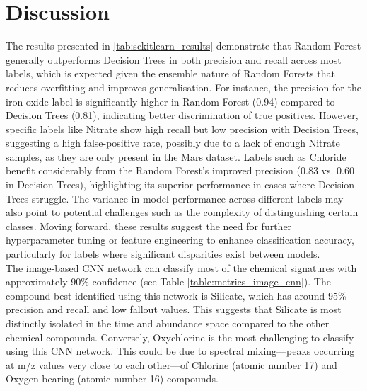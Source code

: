 \section{Discussion} \label{sec:discussions}
The results presented in \cref{tab:sckitlearn_results} demonstrate that Random Forest generally outperforms Decision Trees in both precision and recall across most labels, which is expected given the ensemble nature of Random Forests that reduces overfitting and improves generalisation. For instance, the precision for the iron oxide label is significantly higher in Random Forest (0.94) compared to Decision Trees (0.81), indicating better discrimination of true positives. However, specific labels like Nitrate show high recall but low precision with Decision Trees, suggesting a high false-positive rate, possibly due to a lack of enough Nitrate samples, as they are only present in the Mars dataset. Labels such as Chloride benefit considerably from the Random Forest's improved precision (0.83 vs. 0.60 in Decision Trees), highlighting its superior performance in cases where Decision Trees struggle. The variance in model performance across different labels may also point to potential challenges such as the complexity of distinguishing certain classes. Moving forward, these results suggest the need for further hyperparameter tuning or feature engineering to enhance classification accuracy, particularly for labels where significant disparities exist between models. \\

The image-based CNN network can classify most of the chemical signatures with approximately 90\% confidence (see Table \ref{table:metrics_image_cnn}). The compound best identified using this network is Silicate, which has around 95\% precision and recall and low fallout values. This suggests that Silicate is most distinctly isolated in the time and abundance space compared to the other chemical compounds. Conversely, Oxychlorine is the most challenging to classify using this CNN network. This could be due to spectral mixing---peaks occurring at m/z values very close to each other---of Chlorine (atomic number 17) and Oxygen-bearing (atomic number 16) compounds. \\



